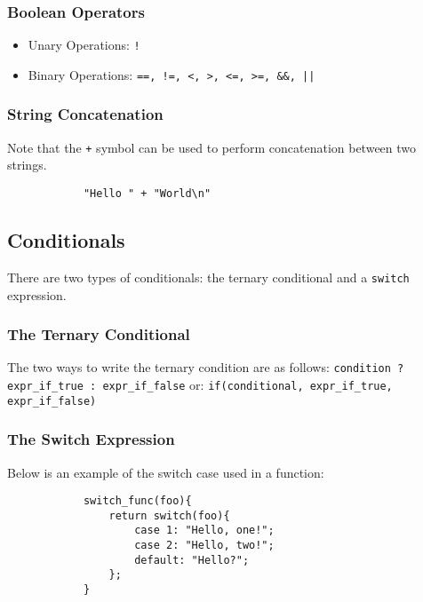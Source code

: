 		\subsubsection{Boolean Operators}
			\begin{itemize}
				\item Unary Operations: \texttt{!}
				\item Binary Operations: \texttt{==, !=, <, >, <=, >=, \&\&, ||}
			\end{itemize}

		\subsubsection{String Concatenation}
		Note that the \texttt{+} symbol can be used to perform concatenation between two strings.

		\begin{lstlisting}
			"Hello " + "World\n"
		\end{lstlisting}

	\subsection{Conditionals}
	There are two types of conditionals: the ternary conditional and a \texttt{switch} expression.

		\subsubsection{The Ternary Conditional}
		The two ways to write the ternary condition are as follows: \newline \newline
		\texttt{condition ? expr\_if\_true : expr\_if\_false} \newline \newline
		or: \newline \newline
		\texttt{if(conditional, expr\_if\_true, expr\_if\_false)}

		\subsubsection{The Switch Expression}
		Below is an example of the switch case used in a function:

		\begin{lstlisting}
			switch_func(foo){
				return switch(foo){
					case 1: "Hello, one!";
					case 2: "Hello, two!";
					default: "Hello?";
				};
			}
		\end{lstlisting}

